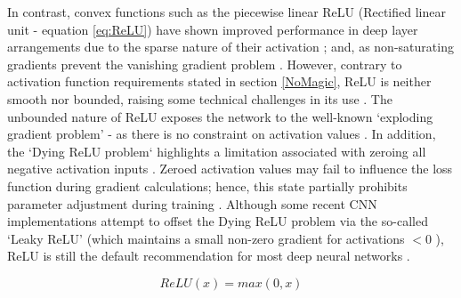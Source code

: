 In contrast, convex functions such as the piecewise linear ReLU (Rectified linear unit - equation \ref{eq:ReLU}) have shown improved performance in deep layer arrangements due to the sparse nature of their activation \cite{Krizhevsky2012}; and, as non-saturating gradients prevent the vanishing gradient problem \cite{Lundervold2019}. However, contrary to activation function requirements stated in section \ref{NoMagic}, ReLU is neither smooth nor bounded, raising some technical challenges in its use \cite{Lundervold2019}. The unbounded nature of ReLU exposes the network to the well-known `exploding gradient problem' - as there is no constraint on activation values \cite{xu2015}. In addition, the `Dying ReLU problem` highlights a limitation associated with zeroing all negative activation inputs \cite{xu2015}. Zeroed activation values may fail to influence the loss function during gradient calculations; hence, this state partially prohibits parameter adjustment during training \cite{xu2015}. Although some recent CNN implementations attempt to offset the Dying ReLU problem via the so-called `Leaky ReLU' (which maintains a small non-zero gradient for activations $< 0$ \cite{Maas2013}), ReLU is still the default recommendation for most deep neural networks \cite{Goodfellow2016}.

\begin{equation}
ReLU(x) = max(0,x)
\label{eq:ReLU}
\end{equation}




%
%
%

